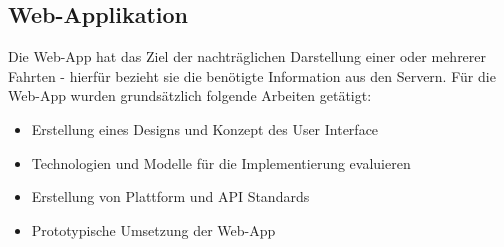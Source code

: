 \subsection{Web-Applikation}
\label{subsec:webapp}

Die Web-App hat das Ziel der nachträglichen Darstellung einer oder mehrerer Fahrten - hierfür bezieht sie die benötigte Information aus den Servern. Für die Web-App wurden grundsätzlich folgende Arbeiten getätigt:

\begin{itemize}
\item Erstellung eines Designs und Konzept des User Interface
\item Technologien und Modelle für die Implementierung evaluieren
\item Erstellung von Plattform und API Standards
\item Prototypische Umsetzung der Web-App
\end{itemize}



